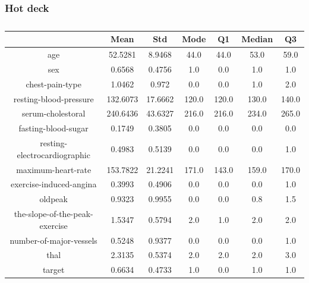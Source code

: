 \documentclass{classrep}
\begin{document}
{{            \subsubsection{Hot deck}
            \label{results:45-percent:dot-deck} {
                \begin{table}[!htbp]
                    \centering
                    \begin{tabular}{|c|c|c|c|c|c|c|}
                        \hline
                        & Mean & Std & Mode & Q1 & Median & Q3 \\ \hline
                        age & 52.5281 & 8.9468 & 44.0 & 44.0 & 53.0 & 59.0 \\ \hline
                        sex & 0.6568 & 0.4756 & 1.0 & 0.0 & 1.0 & 1.0 \\ \hline
                        chest-pain-type & 1.0462 & 0.972 & 0.0 & 0.0 & 1.0 & 2.0 \\ \hline
                        resting-blood-pressure & 132.6073 & 17.6662 & 120.0 & 120.0 & 130.0 & 140.0 \\ \hline
                        serum-cholestoral & 240.6436 & 43.6327 & 216.0 & 216.0 & 234.0 & 265.0 \\ \hline
                        fasting-blood-sugar & 0.1749 & 0.3805 & 0.0 & 0.0 & 0.0 & 0.0 \\ \hline
                        resting-electrocardiographic & 0.4983 & 0.5139 & 0.0 & 0.0 & 0.0 & 1.0 \\ \hline
                        maximum-heart-rate & 153.7822 & 21.2241 & 171.0 & 143.0 & 159.0 & 170.0 \\ \hline
                        exercise-induced-angina & 0.3993 & 0.4906 & 0.0 & 0.0 & 0.0 & 1.0 \\ \hline
                        oldpeak & 0.9323 & 0.9955 & 0.0 & 0.0 & 0.8 & 1.5 \\ \hline
                        the-slope-of-the-peak-exercise & 1.5347 & 0.5794 & 2.0 & 1.0 & 2.0 & 2.0 \\ \hline
                        number-of-major-vessels & 0.5248 & 0.9377 & 0.0 & 0.0 & 0.0 & 1.0 \\ \hline
                        thal & 2.3135 & 0.5374 & 2.0 & 2.0 & 2.0 & 3.0 \\ \hline
                        target & 0.6634 & 0.4733 & 1.0 & 0.0 & 1.0 & 1.0 \\ \hline
                    \end{tabular}
                    \caption{}
                    \label{result_45_Hot-deck}
                \end{table}
                \FloatBarrier

}}}
\end{document}
